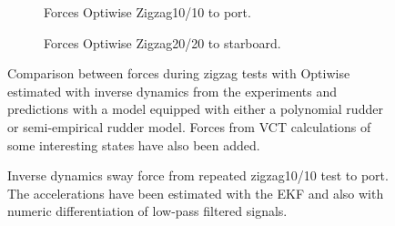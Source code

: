 \begin{figure}[h]
     \centering
     \begin{subfigure}[b]{\textwidth}
         \centering
         
        \caption{Forces Optiwise Zigzag10/10 to port.}
        \label{fig:ID_optiwise10}
     \end{subfigure}
     \vfill
     \begin{subfigure}[b]{\textwidth}
         
        \caption{Forces Optiwise Zigzag20/20 to starboard.}
        \label{fig:ID_optiwise20}
     \end{subfigure}
        \caption{Comparison between forces during zigzag tests with Optiwise estimated with inverse dynamics from the experiments and predictions with a model equipped with either a polynomial rudder or semi-empirical rudder model. Forces from VCT calculations of some interesting states have also been added.}
        \label{fig:ID_optiwise}
\end{figure}
\begin{figure}[h]
    \centering
    
    \caption{Inverse dynamics sway force from repeated zigzag10/10 test to port. The accelerations have been estimated with the EKF and also with numeric differentiation of low-pass filtered signals.}
    \label{fig:lowpass_deviation_points}
\end{figure}